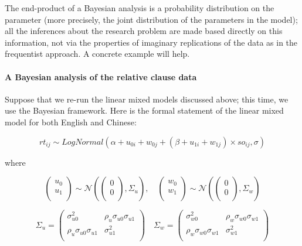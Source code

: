 \documentclass{ar-1col}\usepackage[]{graphicx}\usepackage[]{color}
\begin{document}
The end-product of a Bayesian analysis is a probability distribution on the parameter (more precisely, the joint distribution of the parameters in the model); all the inferences about the research problem are made based directly on this information, not via the properties of imaginary replications of the data as in the frequentist approach. A concrete example will help.


\paragraph{A Bayesian analysis of the relative clause data}
Suppose that we re-run the linear mixed models discussed above; this time, we use the Bayesian framework. Here is the formal statement of the linear mixed model for both English and Chinese:

\begin{equation*} \label{eq:mainmodel}
rt_{ij} \sim LogNormal(\alpha + u_{0i} + w_{0j} + (\beta + u_{1i} + w_{1j}) \times so_{ij}, \sigma)
\end{equation*}

\noindent
where

\begin{equation*}\label{eq:jointpriordistLM}
\begin{pmatrix}
  u_0 \\
  u_1 \\
\end{pmatrix}
\sim
\mathcal{N} \left(
\begin{pmatrix}
  0 \\
  0 \\
\end{pmatrix},
\Sigma_{u}
\right),
\quad
\begin{pmatrix}
  w_0 \\
  w_1 \\
\end{pmatrix}
\sim
\mathcal{N}\left(
\begin{pmatrix}
  0 \\
  0 \\
\end{pmatrix},
\Sigma_{w}
\right)
\end{equation*}


\begin{equation*}\label{eq:covmatLM}
\Sigma_u
=
\begin{pmatrix}
\sigma _{u0}^2  & \rho _{u}\sigma _{u0}\sigma _{u1}\\
\rho _{u}\sigma _{u0}\sigma _{u1}    & \sigma _{u1}^2\\
\end{pmatrix}
\quad
\Sigma _w
=
\begin{pmatrix}
\sigma _{w0}^2  & \rho _{w}\sigma _{w0}\sigma _{w1}\\
\rho _{w}\sigma _{w0}\sigma _{w1}    & \sigma _{w1}^2\\
\end{pmatrix}
\end{equation*}
\end{document}
